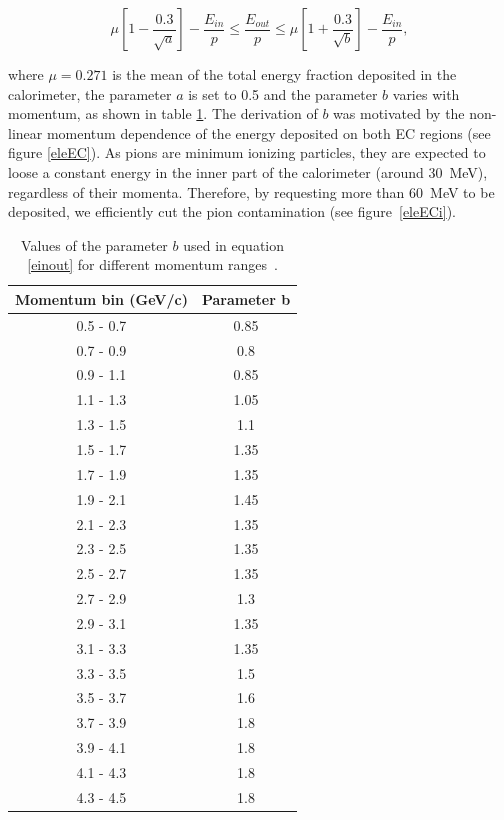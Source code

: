 \begin{equation}
\label{einout}
\mu  \left[1-\frac{0.3}{\sqrt{a}}\right] - \frac{E_{in}}{p} \leq 
\frac{E_{out}}{p} \leq 
\mu  \left[1+\frac{0.3}{\sqrt{b}}\right] - \frac{E_{in}}{p},
\end{equation}

where $\mu = 0.271$ is the mean of the total energy fraction deposited in the 
calorimeter, the parameter $a$ is set to 0.5 and the parameter 
$b$ varies with momentum, as shown in table \ref{tab:ecoutin-par}. The derivation of $b$ was motivated by the non-linear momentum dependence of the energy 
deposited on both EC regions (see figure \ref{eleEC}). As pions are 
minimum ionizing particles, they are expected to loose a constant energy in 
the inner part of the calorimeter (around 30~MeV), regardless of their 
momenta. Therefore, by requesting more than 60~MeV to be deposited, we 
efficiently cut the pion contamination (see figure~\ref{eleECi}).

\begin{table}[tbp]
  \centering
  \begin{tabular}{@{} cc @{}}
    \hline
    Momentum bin (GeV/c)& Parameter b \\ 
    \hline
    0.5 - 0.7 & 0.85 \\
    0.7 - 0.9 & 0.8  \\
    0.9 - 1.1 & 0.85 \\
    1.1 - 1.3 & 1.05 \\
    1.3 - 1.5 & 1.1  \\
    1.5 - 1.7 & 1.35 \\
    1.7 - 1.9 & 1.35 \\
    1.9 - 2.1 & 1.45 \\
    2.1 - 2.3 & 1.35 \\
    2.3 - 2.5 & 1.35 \\
    2.5 - 2.7 & 1.35 \\
    2.7 - 2.9 & 1.3  \\
    2.9 - 3.1 & 1.35 \\
    3.1 - 3.3 & 1.35 \\
    3.3 - 3.5 & 1.5  \\
    3.5 - 3.7 & 1.6  \\
    3.7 - 3.9 & 1.8  \\
    3.9 - 4.1 & 1.8  \\
    4.1 - 4.3 & 1.8  \\
    4.3 - 4.5 & 1.8  \\
    \hline
  \end{tabular}
  \caption{Values of the parameter $b$ used in equation \ref{einout} for 
           different momentum ranges~\cite{ElFassi:2008}.}
  \label{tab:ecoutin-par}
\end{table}

